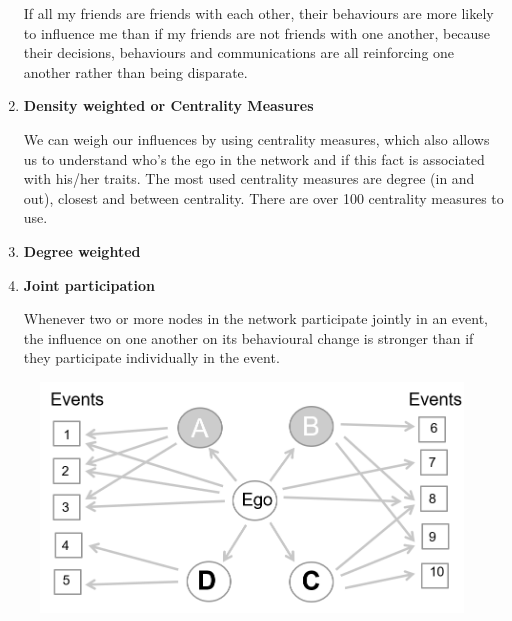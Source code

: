 \documentclass[
  notitlepage,
  onecolumn,
  openany]{book}
\begin{document}
\begin{enumerate}
  If all my friends are friends with each other, their behaviours are more likely to influence me than if my friends are not friends with one another, because their decisions, behaviours and communications are all reinforcing one another rather than being disparate.
\item
  \textbf{Density weighted or Centrality Measures}

  We can weigh our influences by using centrality measures, which also allows us to understand who's the ego in the network and if this fact is associated with his/her traits. The most used centrality measures are degree (in and out), closest and between centrality. There are over 100 centrality measures to use.
\item
  \textbf{Degree weighted}
\item
  \textbf{Joint participation}

  Whenever two or more nodes in the network participate jointly in an event, the influence on one another on its behavioural change is stronger than if they participate individually in the event.
\end{enumerate}

\begin{figure}[h!]

{\centering \includegraphics[width=0.5\linewidth]{images/14-Christakis and Valente/Untitled 4} 

}

\end{figure}
\end{document}
